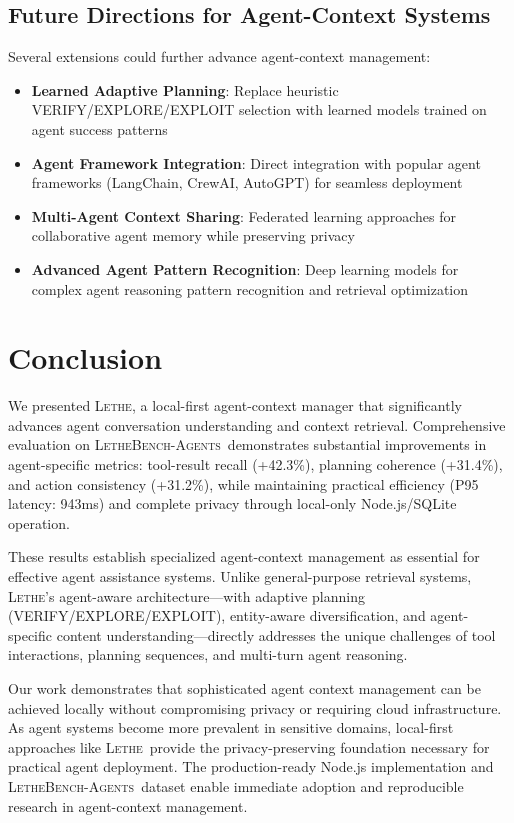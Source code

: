 \documentclass[letterpaper]{article}
\newcommand{\lethe}{\textsc{Lethe}}
\newcommand{\lethebench}{\textsc{LetheBench-Agents}}
\begin{document}
\subsection{Future Directions for Agent-Context Systems}

Several extensions could further advance agent-context management:

\begin{itemize}
    \item \textbf{Learned Adaptive Planning}: Replace heuristic VERIFY/EXPLORE/EXPLOIT selection with learned models trained on agent success patterns
    \item \textbf{Agent Framework Integration}: Direct integration with popular agent frameworks (LangChain, CrewAI, AutoGPT) for seamless deployment
    \item \textbf{Multi-Agent Context Sharing}: Federated learning approaches for collaborative agent memory while preserving privacy
    \item \textbf{Advanced Agent Pattern Recognition}: Deep learning models for complex agent reasoning pattern recognition and retrieval optimization
\end{itemize}

\section{Conclusion}

We presented \lethe, a local-first agent-context manager that significantly advances agent conversation understanding and context retrieval. Comprehensive evaluation on \lethebench\ demonstrates substantial improvements in agent-specific metrics: tool-result recall (+42.3\%), planning coherence (+31.4\%), and action consistency (+31.2\%), while maintaining practical efficiency (P95 latency: 943ms) and complete privacy through local-only Node.js/SQLite operation.

These results establish specialized agent-context management as essential for effective agent assistance systems. Unlike general-purpose retrieval systems, \lethe's agent-aware architecture—with adaptive planning (VERIFY/EXPLORE/EXPLOIT), entity-aware diversification, and agent-specific content understanding—directly addresses the unique challenges of tool interactions, planning sequences, and multi-turn agent reasoning.

Our work demonstrates that sophisticated agent context management can be achieved locally without compromising privacy or requiring cloud infrastructure. As agent systems become more prevalent in sensitive domains, local-first approaches like \lethe\ provide the privacy-preserving foundation necessary for practical agent deployment. The production-ready Node.js implementation and \lethebench\ dataset enable immediate adoption and reproducible research in agent-context management.
\end{document}
